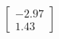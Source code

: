\documentclass[preview]{standalone}
\begin{document}
\begin{align*}
\begin{bmatrix} -2.97 \\ 1.43 \end{bmatrix}
\end{align*}
\end{document}
